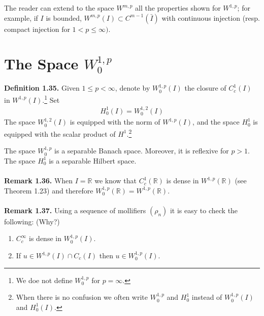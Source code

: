 \documentclass[a4paper,oneside]{book}
\numberwithin{equation}{chapter}
\begin{document}
The reader can extend to the space $W^{m,p}$ all the properties shown for $W^{1,p}$; for example, if $I$ is bounded, $W^{m,p}\left(I\right) \subset C^{m-1}\left(\bar{I}\right)$ with continuous injection (resp. compact injection for $1<p\le \infty)$.
\section{The Space $W_0^{1,p}$} 
\textbf{Definition 1.35.} Given $1\le p<\infty$, denote by $W_0^{1,p}\left(I\right)$ the closure of $C_c^1\left(I\right)$ in $W^{1,p}\left(I\right)$.\footnote{We doe not define $W_0^{1,p}$ for $p=\infty$.} Set
\begin{align}
H_0^1\left( I \right) = W_0^{1,2}\left( I \right)
\end{align}
The space $W_0^{1,2}\left(I\right)$ is equipped with the norm of $W^{1,p}\left(I\right)$, and the space $H_0^1$ is equipped with the scalar product of $H^1$.\footnote{When there is no confusion we often write $W_0^{1,p}$ and $H_0^1$ instead of $W_0^{1,p}\left(I\right)$ and $H_0^1\left(I\right)$.}

The space $W_0^{1,p}$ is a separable Banach space. Moreover, it is reflexive for $p>1$. The space $H_0^1$ is a separable Hilbert space.\\
\\
\textbf{Remark 1.36.} When $I=\mathbb{R}$ we know that $C_c^1\left(\mathbb{R}\right)$ is dense in $W^{1,p}\left(\mathbb{R}\right)$ (see Theorem 1.23) and therefore $W_0^{1,p}\left(\mathbb{R}\right)=W^{1,p}\left(\mathbb{R}\right)$.\\
\\
\textbf{Remark 1.37.} Using a sequence of mollifiers $\left(\rho _n\right)$ it is easy to check the following: (Why?)
\begin{enumerate}
\item $C_c^{\infty}$ is dense in $W_0^{1,p}\left(I\right)$.
\item If $u \in {W^{1,p}}\left( I \right) \cap {C_c}\left( I \right)$ then $u\in W_0^{1,p}\left(I\right)$. 
\end{enumerate}
\end{document}
